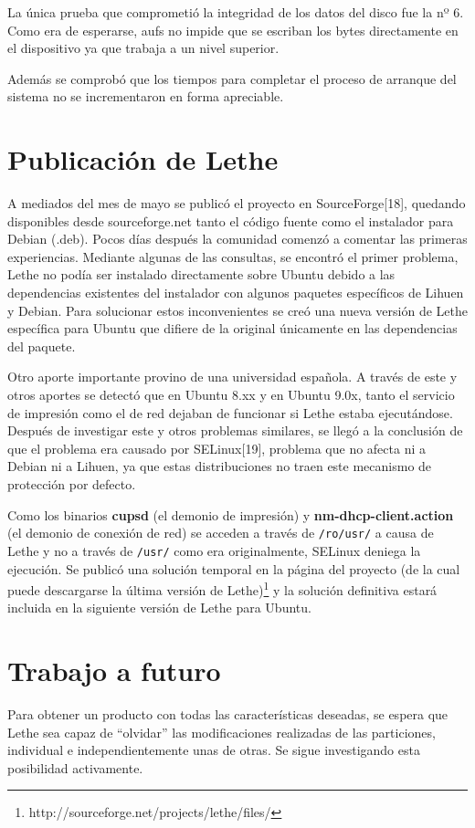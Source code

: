 \documentclass[final,narroweqnarray,inline,twoside]{ieee}
\newcommand{\itref}[1]{[{#1}]}
\begin{document}
La única prueba que comprometió la integridad de los datos del disco fue la nº 6. Como era de esperarse, aufs no impide que se escriban los bytes directamente en el dispositivo ya que trabaja a un nivel superior.

Además se comprobó que los tiempos para completar el proceso de arranque del sistema no se incrementaron en forma apreciable.

\section{Publicación de Lethe}
A mediados del mes de mayo se publicó el proyecto en SourceForge\itref{18}, quedando disponibles desde sourceforge.net tanto el código fuente como el instalador para Debian (.deb). Pocos días después la comunidad comenzó a comentar las primeras experiencias. Mediante algunas de las consultas, se encontró el primer problema, Lethe no podía ser instalado directamente sobre Ubuntu debido a las dependencias existentes del instalador con algunos paquetes específicos de Lihuen y Debian. Para solucionar estos inconvenientes se creó una nueva versión de Lethe específica para Ubuntu que difiere de la original únicamente en las dependencias del paquete.

Otro aporte importante provino de una universidad española. A través de este y otros aportes se detectó que en Ubuntu 8.xx y en Ubuntu 9.0x, tanto el servicio de impresión como el de red dejaban de funcionar si Lethe estaba ejecutándose.
Después de investigar este y otros problemas similares, se llegó a la conclusión de que el problema era causado por SELinux\itref{19}, problema que no afecta ni a Debian ni a Lihuen, ya que estas distribuciones no traen este mecanismo de protección por defecto.

Como los binarios \textbf{cupsd} (el demonio de impresión) y \textbf{nm-dhcp-client.action} (el demonio de conexión de red) se acceden a través de \texttt{/ro/usr/} a causa de Lethe y no a través de \texttt{/usr/} como era originalmente, SELinux deniega la ejecución. Se publicó una solución temporal en la página del proyecto (de la cual puede descargarse la última versión de Lethe)\footnote{http://sourceforge.net/projects/lethe/files/} y la solución definitiva estará incluida en la siguiente versión de Lethe para Ubuntu.

\section{Trabajo a futuro}
Para obtener un producto con todas las características deseadas, se espera que Lethe sea capaz de ``olvidar'' las modificaciones realizadas de las particiones, individual e independientemente unas de otras. Se sigue investigando esta posibilidad activamente.
\end{document}
